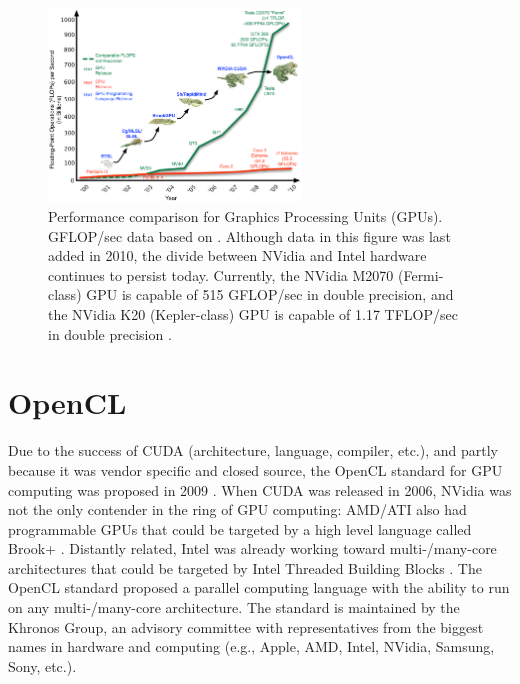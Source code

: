 \documentclass{report}
\begin{document}
\begin{figure}
\centering
\includegraphics[width=0.6\textwidth]{../figures/prospectus/GPU_Evolution_opencl.pdf}
\caption{Performance comparison for Graphics Processing Units (GPUs). GFLOP/sec data based on \cite{Behr2009, OpenCL2009}. Although data in this figure was last added in 2010, the divide between NVidia and Intel hardware continues to persist today. Currently, the NVidia M2070 (Fermi-class) GPU is capable of 515 GFLOP/sec in double precision, and the NVidia K20 (Kepler-class) GPU is capable of 1.17 TFLOP/sec in double precision \cite{CudaGuide2013}.}
\label{fig:floating-point-operations-per-second}
\end{figure}

\section{OpenCL}

Due to the success of CUDA (architecture, language, compiler, etc.), and partly because it was vendor specific and closed source, the OpenCL standard for GPU computing was proposed in 2009 \cite{OpenCL2009}. When CUDA was released in 2006, NVidia was not the only contender in the ring of GPU computing: AMD/ATI also had programmable GPUs that could be targeted by a high level language called Brook+ \cite{BrookGPU2004}. Distantly related, Intel was already working toward multi-/many-core architectures that could be targeted by Intel Threaded Building Blocks \cite{IntelTBB}. The OpenCL standard proposed a parallel computing language with the ability to run on any multi-/many-core architecture. The standard is maintained by the Khronos Group, an advisory committee with representatives from the biggest names in hardware and computing (e.g., Apple, AMD, Intel, NVidia, Samsung, Sony, etc.). 
\end{document}

